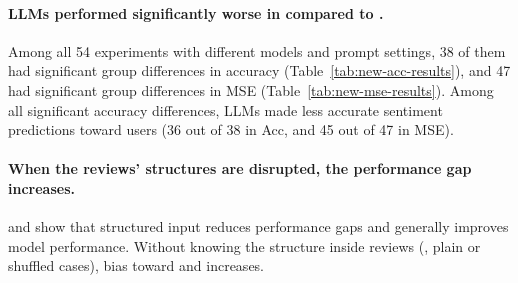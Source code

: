 \paragraph{LLMs performed significantly worse in \twChinese compared to \cnChinese.}
Among all 54 experiments with different models and prompt settings, 38 of them had significant group differences in accuracy (Table~\ref{tab:new-acc-results}), and 47 had significant group differences in MSE (Table~\ref{tab:new-mse-results}).
Among all significant accuracy differences, LLMs made less accurate sentiment predictions toward \twChinese users (36 out of 38 in Acc, and 45 out of 47 in MSE).



\paragraph{When the reviews' structures are disrupted, the performance gap increases.}
 and  show that %
structured input reduces performance gaps and generally improves model performance.
Without knowing the structure inside reviews (\ie, plain or shuffled cases), bias toward \twChinese and \cnChinese increases.


